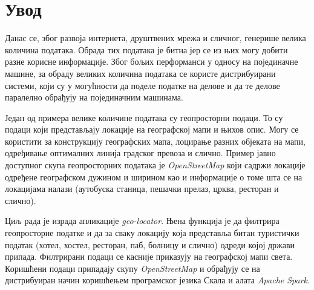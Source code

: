 \documentclass[12pt,oneside]{memoir}
\begin{document}
\frontmatter
\naslovna
\komisija
\apstrakt
\tableofcontents*

\mainmatter


\chapter{Увод}
\label{chp:uvod}

Данас се, због развоја интернета, друштвених мрежа и сличног, генерише велика количина података. Обрада тих података је битна јер се из њих могу добити разне корисне информације. Због бољих перформанси у односу на појединачне машине, за обраду великих количина података се користе дистрибуирани системи, који су у могућности да поделе податке на делове и да те делове паралелно обрађују на појединачним машинама.

Један од примера велике количине података су геопросторни подаци. То су подаци који представљају локације на географској мапи и њихов опис. Могу се користити за конструкцију географских мапа, лоцирање разних објеката на мапи, одређивање оптималних линија градског превоза и слично. Пример јавно доступног скупа геопросторних података је \textit{OpenStreetMap} који садржи локације одређене географском дужином и ширином као и информације о томе шта се на локацијама налази (аутобуска станица, пешачки прелаз, црква, ресторан и слично).

Циљ рада је израда апликације \textit{geo-locator}. Њена функција је да филтрира геопросторне податке и да за сваку локацију која представља битан туристички податак (хотел, хостел, ресторан, паб, болницу и слично) одреди којој држави припада. Филтрирани подаци се касније приказују на географској мапи света. Коришћени подаци припадају скупу \textit{OpenStreetMap} и обрађују се на дистрибуиран начин коришћењем програмског језика Скала и алата \textit{Apache Spark}.
\end{document}
